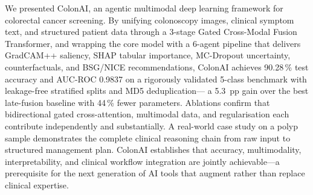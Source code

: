 \documentclass[conference]{IEEEtran}
\begin{document}
We presented ColonAI, an agentic multimodal deep learning framework for
colorectal cancer screening. By unifying colonoscopy images, clinical symptom
text, and structured patient data through a 3-stage Gated Cross-Modal Fusion
Transformer, and wrapping the core model with a 6-agent pipeline that delivers
GradCAM++ saliency, SHAP tabular importance, MC-Dropout uncertainty,
counterfactuals, and BSG/NICE recommendations, ColonAI achieves 90.28\,\%
test accuracy and AUC-ROC 0.9837 on a rigorously validated 5-class
benchmark with leakage-free stratified splits and MD5 deduplication---
a 5.3~pp gain over the best late-fusion baseline with 44\,\% fewer
parameters. Ablations confirm that bidirectional gated cross-attention,
multimodal data, and regularisation each contribute independently and substantially.
A real-world case study on a polyp sample demonstrates the complete clinical
reasoning chain from raw input to structured management plan. ColonAI
establishes that accuracy, multimodality, interpretability, and clinical
workflow integration are jointly achievable---a prerequisite for the next
generation of AI tools that augment rather than replace clinical expertise.
\end{document}
